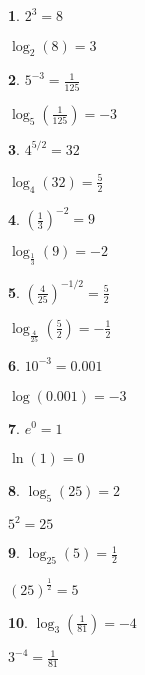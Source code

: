 \documentclass{amsbook}
\newtheorem{exc}{}
\newenvironment{ex}{\begin{exc}\normalfont}{\end{exc}}
\numberwithin{section}{chapter}
\numberwithin{equation}{chapter}
\begin{document}
\begin{multicols}{3}

\begin{ex}
		$2^{3} = 8$
	\begin{sol}
		$\log_{2}(8) = 3$
	\end{sol}
\end{ex}
\begin{ex}
	$5^{-3} = \frac{1}{125}$  
	\begin{sol}
		$\log_{5}\left(\frac{1}{125}\right) = -3$
	\end{sol}
\end{ex}
\begin{ex}
	 $4^{5/2} = 32$  
	\begin{sol}
		$\log_{4}(32) = \frac{5}{2}$
	\end{sol}
\end{ex}
\begin{ex}
	$\left(\frac{1}{3}\right)^{-2} = 9$
	\begin{sol}
		$\log_{\frac{1}{3}}(9) = -2$
	\end{sol}
\end{ex}
\begin{ex}
	$\left(\frac{4}{25}\right)^{-1/2} = \frac{5}{2}$ 
	\begin{sol}
		$\log_{\frac{4}{25}}\left(\frac{5}{2}\right) = -\frac{1}{2}$
	\end{sol}
\end{ex}
\begin{ex}
	$10^{-3} = 0.001$ 
	\begin{sol}
		$\log(0.001) = -3$
	\end{sol}
\end{ex}
\begin{ex}
	$e^{0}  = 1$
	\begin{sol}
		$\ln(1) = 0$
	\end{sol}
\end{ex}
\begin{ex}
	$\log_{5}(25) = 2$ 
	\begin{sol}
		 $5^{2} = 25$
	\end{sol}
\end{ex}
\begin{ex}
	$\log_{25} (5) = \frac{1}{2}$ 
	\begin{sol}
		 $(25)^{\frac{1}{2}} = 5$
	\end{sol}
\end{ex}
\begin{ex}
	$\log_{3} \left(\frac{1}{81} \right) = -4$  
	\begin{sol}
		$3^{-4} = \frac{1}{81}$

\end{sol}
\end{ex}
\end{multicols}
\end{document}
